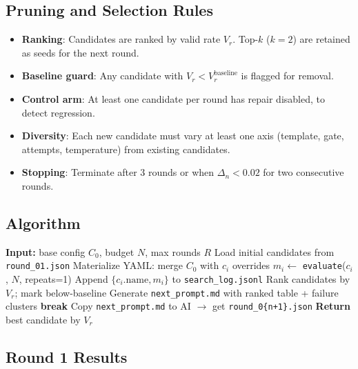 \documentclass[conference]{IEEEtran}
\begin{document}
\subsection{Pruning and Selection Rules}

\begin{itemize}
    \item \textbf{Ranking}: Candidates are ranked by valid rate $V_r$. Top-$k$ ($k=2$) are retained as seeds for the next round.
    \item \textbf{Baseline guard}: Any candidate with $V_r < V_r^{\text{baseline}}$ is flagged for removal.
    \item \textbf{Control arm}: At least one candidate per round has repair disabled, to detect regression.
    \item \textbf{Diversity}: Each new candidate must vary at least one axis (template, gate, attempts, temperature) from existing candidates.
    \item \textbf{Stopping}: Terminate after 3 rounds or when $\Delta_n < 0.02$ for two consecutive rounds.
\end{itemize}

\subsection{Algorithm}

\begin{algorithm}[h]
\caption{Error-Guided Repair Search Loop}
\begin{algorithmic}[1]
\STATE \textbf{Input:} base config $C_0$, budget $N$, max rounds $R$
\STATE Load initial candidates from \texttt{round\_01.json}
        \STATE Materialize YAML: merge $C_0$ with $c_i$ overrides
        \STATE $m_i \leftarrow$ \texttt{evaluate}($c_i$, $N$, repeats=1)
        \STATE Append $\{c_i.\text{name}, m_i\}$ to \texttt{search\_log.jsonl}
    \ENDFOR
    \STATE Rank candidates by $V_r$; mark below-baseline
    \STATE Generate \texttt{next\_prompt.md} with ranked table + failure clusters
        \STATE \textbf{break} 
    \ENDIF
    \STATE Copy \texttt{next\_prompt.md} to AI $\to$ get \texttt{round\_0\{n+1\}.json}
\ENDFOR
\STATE \textbf{Return} best candidate by $V_r$
\end{algorithmic}
\end{algorithm}

\subsection{Round 1 Results}
\end{document}

